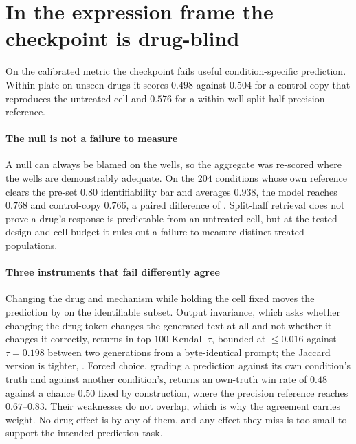 \section{In the expression frame the checkpoint is drug-blind}

On the calibrated metric the checkpoint fails useful condition-specific
prediction. Within plate on unseen drugs it scores $0.498$ against $0.504$ for a
control-copy that reproduces the untreated cell and $0.576$ for a within-well
split-half precision reference.

\paragraph{The null is not a failure to measure} A null can always be blamed on
the wells, so the aggregate was re-scored where the wells are demonstrably
adequate. On the $204$ conditions whose own reference clears the pre-set $0.80$
identifiability bar and averages $0.938$, the model reaches $0.768$ and
control-copy $0.766$, a paired difference of .
Split-half retrieval does not prove a drug's response is predictable from an
untreated cell, but at the tested design and cell budget it rules out a failure
to measure distinct treated populations.

\paragraph{Three instruments that fail differently agree} Changing the drug and
mechanism while holding the cell fixed moves the prediction by
 on the identifiable subset. Output invariance, which
asks whether changing the drug token changes the generated text at all and not
whether it changes it correctly, returns  in top-$100$
Kendall $\tau$, bounded at $\leq 0.016$ against $\tau = 0.198$ between two
generations from a byte-identical prompt; the Jaccard version is tighter,
. Forced choice, grading a prediction against its own
condition's truth and against another condition's, returns an own-truth win rate
of $0.48$ against a chance $0.50$ fixed by construction, where the precision
reference reaches $0.67$--$0.83$. Their weaknesses do not overlap, which is why
the agreement carries weight. No drug effect is \shownzero by any of them, and
any effect they miss is too small to support the intended prediction task.

